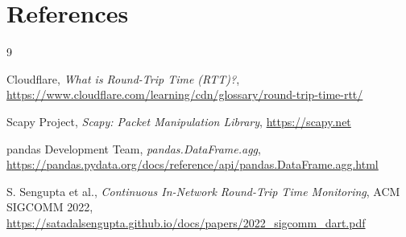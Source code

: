 \documentclass[12pt,a4paper]{article}
\begin{document}
\section*{References}

\begin{thebibliography}{9}

Cloudflare, \textit{What is Round-Trip Time (RTT)?},
\url{https://www.cloudflare.com/learning/cdn/glossary/round-trip-time-rtt/}

Scapy Project, \textit{Scapy: Packet Manipulation Library},
\url{https://scapy.net}

pandas Development Team, \textit{pandas.DataFrame.agg},
\url{https://pandas.pydata.org/docs/reference/api/pandas.DataFrame.agg.html}

S. Sengupta et al., \textit{Continuous In-Network Round-Trip Time Monitoring},
ACM SIGCOMM 2022,
\url{https://satadalsengupta.github.io/docs/papers/2022_sigcomm_dart.pdf}

\end{thebibliography}
\end{document}
